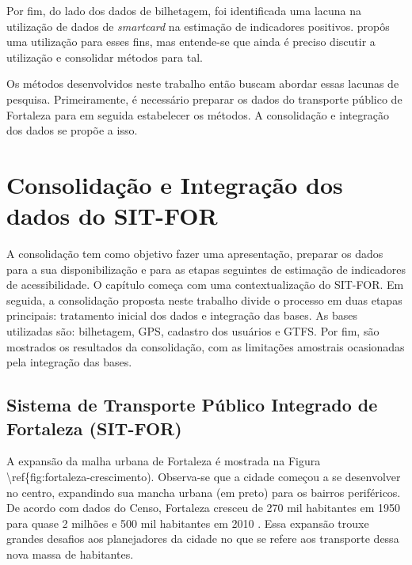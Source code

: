 \documentclass[        
    a4paper,          %
    12pt,             %
    chapter=TITLE,    %
    section=Title,    %
    subsection=Title, %
    oneside,          %
    english,          %
    spanish,          %
    brazil,           %
    fleqn             %
]{abntex2}
\begin{document}
  Por fim, do lado dos dados de bilhetagem, foi identificada uma lacuna na utilização de dados de \emph{smartcard} na estimação de indicadores positivos. \citet{Arbex2016a} propôs uma utilização para esses fins, mas entende-se que ainda é preciso discutir a utilização e consolidar métodos para tal.
  
  Os métodos desenvolvidos neste trabalho então buscam abordar essas lacunas de pesquisa. Primeiramente, é necessário preparar os dados do transporte público de Fortaleza para em seguida estabelecer os métodos. A consolidação e integração dos dados se propõe a isso.
  
  \hypertarget{consolidacao-e-integracao-dos-dados-do-sit-for}{%
  \chapter{Consolidação e Integração dos dados do SIT-FOR}\label{consolidacao-e-integracao-dos-dados-do-sit-for}}
  
  A consolidação tem como objetivo fazer uma apresentação, preparar os dados para a sua disponibilização e para as etapas seguintes de estimação de indicadores de acessibilidade. O capítulo começa com uma contextualização do SIT-FOR. Em seguida, a consolidação proposta neste trabalho divide o processo em duas etapas principais: tratamento inicial dos dados e integração das bases. As bases utilizadas são: bilhetagem, GPS, cadastro dos usuários e GTFS. Por fim, são mostrados os resultados da consolidação, com as limitações amostrais ocasionadas pela integração das bases.
  
  \hypertarget{sistema-de-transporte-publico-integrado-de-fortaleza-sit-for}{%
  \section{Sistema de Transporte Público Integrado de Fortaleza (SIT-FOR)}\label{sistema-de-transporte-publico-integrado-de-fortaleza-sit-for}}
  
  A expansão da malha urbana de Fortaleza é mostrada na Figura \textbackslash{}ref\{fig:fortaleza-crescimento). Observa-se que a cidade começou a se desenvolver no centro, expandindo sua mancha urbana (em preto) para os bairros periféricos. De acordo com dados do Censo, Fortaleza cresceu de 270 mil habitantes em 1950 para quase 2 milhões e 500 mil habitantes em 2010 \citep{Fortaleza2040}. Essa expansão trouxe grandes desafios aos planejadores da cidade no que se refere aos transporte dessa nova massa de habitantes.
  
\end{document}
